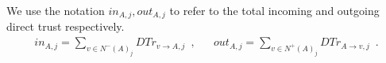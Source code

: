\begin{definition}
\label{inouttrust}
  We use the notation $in_{A, j}, out_{A, j}$ to refer to the total incoming and outgoing direct trust respectively.
  \begin{align}
    in_{A, j} = \sum\limits_{v \in N^{-}\left(A\right)_j}DTr_{v \rightarrow A, j} \enspace, &&
    out_{A, j} = \sum\limits_{v \in N^{+}\left(A\right)_j}DTr_{A \rightarrow v, j} \enspace.
  \end{align}
\end{definition}
